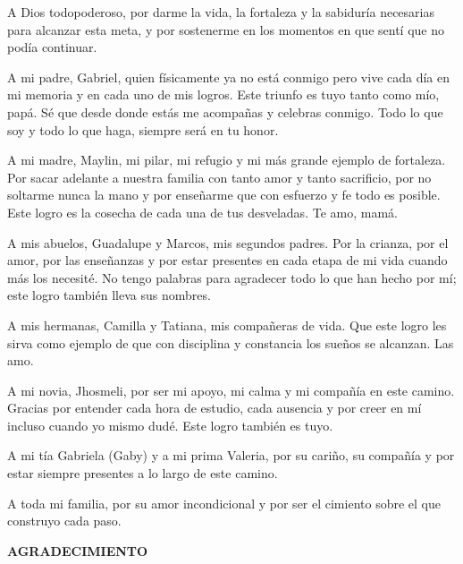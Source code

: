 \documentclass[12pt, letterpaper]{report}
\begin{document}
\begin{flushright}
\begin{minipage}{0.72\textwidth}
A Dios todopoderoso, por darme la vida, la fortaleza y la sabiduría necesarias para alcanzar esta meta, y por sostenerme en los momentos en que sentí que no podía continuar.

A mi padre, Gabriel, quien físicamente ya no está conmigo pero vive cada día en mi memoria y en cada uno de mis logros. Este triunfo es tuyo tanto como mío, papá. Sé que desde donde estás me acompañas y celebras conmigo. Todo lo que soy y todo lo que haga, siempre será en tu honor.

A mi madre, Maylin, mi pilar, mi refugio y mi más grande ejemplo de fortaleza. Por sacar adelante a nuestra familia con tanto amor y tanto sacrificio, por no soltarme nunca la mano y por enseñarme que con esfuerzo y fe todo es posible. Este logro es la cosecha de cada una de tus desveladas. Te amo, mamá.

A mis abuelos, Guadalupe y Marcos, mis segundos padres. Por la crianza, por el amor, por las enseñanzas y por estar presentes en cada etapa de mi vida cuando más los necesité. No tengo palabras para agradecer todo lo que han hecho por mí; este logro también lleva sus nombres.

A mis hermanas, Camilla y Tatiana, mis compañeras de vida. Que este logro les sirva como ejemplo de que con disciplina y constancia los sueños se alcanzan. Las amo.

A mi novia, Jhosmeli, por ser mi apoyo, mi calma y mi compañía en este camino. Gracias por entender cada hora de estudio, cada ausencia y por creer en mí incluso cuando yo mismo dudé. Este logro también es tuyo.

A mi tía Gabriela (Gaby) y a mi prima Valeria, por su cariño, su compañía y por estar siempre presentes a lo largo de este camino.

A toda mi familia, por su amor incondicional y por ser el cimiento sobre el que construyo cada paso.
\end{minipage}
\end{flushright}

\clearpage
\begin{center}
{\fontsize{14}{16}\selectfont\bfseries AGRADECIMIENTO\par}
\end{center}
\vspace{0.8cm}
\end{document}
